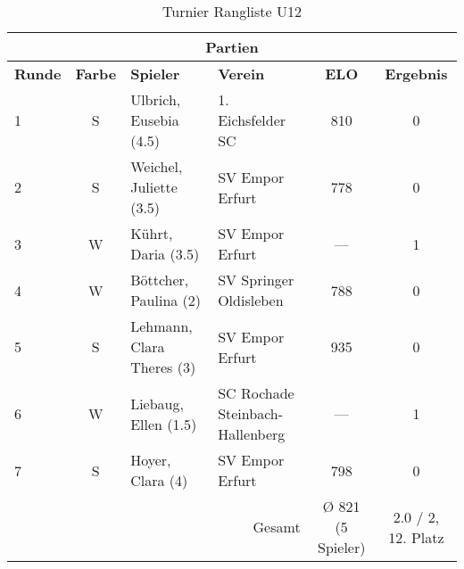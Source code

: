 \begin{table}[htbp]
\centering
\caption{Turnier Rangliste U12}
\begin{tabular}{|l|c|p{1.8in}|l|c|c|}
\hline
\multicolumn{6}{|c|}{Partien} \\
\hline
\textbf{Runde} & \textbf{Farbe} & \textbf{Spieler} & \textbf{Verein} & \textbf{ELO} & \textbf{Ergebnis} \\
\hline
1 & S & Ulbrich, Eusebia (4.5) & 1. Eichsfelder SC & 810 & 0 \\
2 & S & Weichel, Juliette (3.5) & SV Empor Erfurt & 778 & 0 \\
3 & W & Kührt, Daria (3.5) & SV Empor Erfurt & --- & 1 \\
4 & W & Böttcher, Paulina (2) & SV Springer Oldisleben & 788 & 0 \\
5 & S & Lehmann, Clara Theres (3) & SV Empor Erfurt & 935 & 0 \\
6 & W & Liebaug, Ellen (1.5) & SC Rochade Steinbach-Hallenberg & --- & 1 \\
7 & S & Hoyer, Clara (4) & SV Empor Erfurt & 798 & 0 \\
\hline
\multicolumn{4}{|r|}{Gesamt} & Ø 821 (5 Spieler) & 2.0 / 2, 12. Platz \\
\hline
\end{tabular}
\end{table}